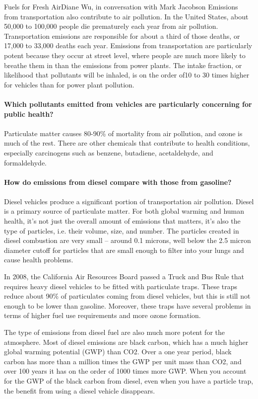 \documentclass[10pt]{papertex}
\begin{document}
\begin{news}{2}{Fuels for Fresh Air}{Diane Wu, in conversation with Mark Jacobson}{}{}
Emissions from transportation also contribute to air pollution. In the United 
States, about 50,000 to 100,000 people die prematurely each year from air 
pollution. Transportation emissions are responsible for about a third of those 
deaths, or 17,000 to 33,000 deaths each year. Emissions from transportation 
are particularly potent because they occur at street level, where people are 
much more likely to breathe them in than the emissions from power plants. The 
intake fraction, or likelihood that pollutants will be inhaled, is on the 
order of10 to 30 times higher for vehicles than for power plant pollution.
\\
\\
\textbf{Which pollutants emitted from vehicles are particularly concerning for 
    public health?}
\\
\\
Particulate matter causes 80-90\% of mortality from air pollution, and ozone 
is much of the rest. There are other chemicals that contribute to health 
conditions, especially carcinogens such as benzene, butadiene, acetaldehyde, 
and formaldehyde.
\\
\\
\textbf{How do emissions from diesel compare with those from gasoline?}
\\
\\
Diesel vehicles produce a significant portion of transportation air pollution. 
Diesel is a primary source of particulate matter. For both global warming and 
human health, it’s not just the overall amount of emissions that matters, it’s 
also the type of particles, i.e. their volume, size, and number. The particles 
created in diesel combustion are very small – around 0.1 microns, well below 
the 2.5 micron diameter cutoff for particles that are small enough to filter 
into your lungs and cause health problems.

In 2008, the California Air Resources Board passed a Truck and Bus Rule that 
requires heavy diesel vehicles to be fitted with particulate traps. These 
traps reduce about 90\% of particulates coming from diesel vehicles, but this 
is still not enough to be lower than gasoline. Moreover, these traps have 
several problems in terms of higher fuel use requirements and more ozone 
formation.

The type of emissions from diesel fuel are also much more potent for the 
atmosphere. Most of diesel emissions are black carbon, which has a much higher 
global warming potential (GWP) than CO2. Over a one year period, black carbon 
has more than a million times the GWP per unit mass than CO2, and over 100 
years it has on the order of 1000 times more GWP. When you account for the 
GWP of the black carbon from diesel, even when you have a particle trap, the 
benefit from using a diesel vehicle disappears.


\end{news}
\end{document}
